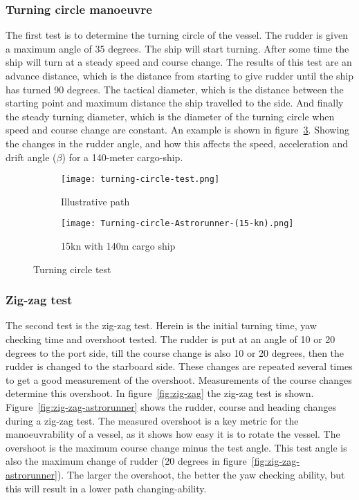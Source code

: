 \subsubsection{Turning circle manoeuvre}
The first test is to determine the turning circle of the vessel. The rudder is given a maximum angle of 35 degrees. The ship will start turning. After some time the ship will turn at a steady speed and course change. The results of this test are an advance distance, which is the distance from starting to give rudder until the ship has turned 90 degrees. The tactical diameter, which is the distance between the starting point and maximum distance the ship travelled to the side. And finally the steady turning diameter, which is the diameter of the turning circle when speed and course change are constant. An example is shown in figure~\ref{fig:turning-circle}. Showing the changes in the rudder angle, and how this affects the speed, acceleration and drift angle ($\beta$) for a 140-meter cargo-ship.

\begin{figure}[p]
	\begin{subfigure}[b]{0.43\linewidth}
		\centering
		\texttt{[image: turning-circle-test.png]}
		\caption{Illustrative path}
		\label{fig:turning-circle-path}
	\end{subfigure} 
	\begin{subfigure}[b]{0.56\linewidth}
		\centering
		\texttt{[image: Turning-circle-Astrorunner-(15-kn).png]}
		\caption{15kn with 140m cargo ship}
		\label{fig:turning-circle-astrorunner}
	\end{subfigure}
	\caption{Turning circle test}
	\label{fig:turning-circle} 
\end{figure}

\subsubsection{Zig-zag test}
The second test is the zig-zag test. Herein is the initial turning time, yaw checking time and overshoot tested. The rudder is put at an angle of 10 or 20 degrees to the port side, till the course change is also 10 or 20 degrees, then the rudder is changed to the starboard side. These changes are repeated several times to get a good measurement of the overshoot. Measurements of the course changes determine this overshoot. In figure~\ref{fig:zig-zag} the zig-zag test is shown. Figure~\ref{fig:zig-zag-astrorunner} shows the rudder, course and heading changes during a zig-zag test. The measured overshoot is a key metric for the manoeuvrability of a vessel, as it shows how easy it is to rotate the vessel. The overshoot is the maximum course change minus the test angle. This test angle is also the maximum change of rudder (20 degrees in figure~\ref{fig:zig-zag-astrorunner}). The larger the overshoot, the better the yaw checking ability, but this will result in a lower path changing-ability.

